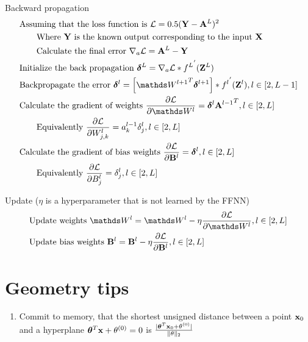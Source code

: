Backward propagation
\begin {equation} \begin {split}
& \text {Assuming that the loss function is } \cL = 0.5 (\vY - \vA^L)^2 \\
& \qquad \text {Where $\vY$ is the known output corresponding to the input $\vX$} \\
& \qquad \text {Calculate the final error } \nabla_a \cL =  \vA^L - \vY \\
& \text {Initialize  the back propagation } \vdelta^L =  \ewise {\nabla_a \cL} {{f^L}^{'} (\vZ^L)} \\
& \text {Backpropagate the error } \vdelta^l =  \ewise {\left[ {\mW^{l+1}}^T \vdelta^{l+1} \right]} {{f^{l}}^{'} (\vZ^l)}, l \in [2, L-1] \\
& \text {Calculate the gradient of weights } \frac {\partial \cL} {\partial \mW^l} = \vdelta^l {\vA^{l-1}}^T, l \in [2, L] \\
& \qquad \text {Equivalently } \frac {\partial \cL} {\partial W_{j,k}^l} = a_k^{l-1} \delta_j^l, l \in [2, L] \\
& \text {Calculate the gradient of bias weights } \frac {\partial \cL} {\partial \vB^l} = \vdelta^l, l \in [2, L] \\
& \qquad \text {Equivalently } \frac {\partial \cL} {\partial B_j^l} = \delta_j^l, l \in [2, L] \\
\end {split} \end {equation}

Update ($\eta$ is a hyperparameter that is not learned by the FFNN)
\begin {equation} \begin {split}
& \text {Update weights } \mW^l = \mW^l - \eta \frac {\partial \cL} {\partial \mW^l}, l \in [2, L] \\
& \text {Update bias weights } \vB^l = \vB^l - \eta \frac {\partial \cL} {\partial \vB^l}, l \in [2, L] \\
\end {split} \end {equation}

\section {Geometry tips}
\begin {enumerate}
\item Commit to memory, that the shortest unsigned distance between a point $\mathbf{x}_0$ and a hyperplane $\bm{\theta}^T \mathbf{x} + \mathrm{\theta^{(0)}} = 0$ is $\frac {|{\bm{\theta}^T \mathbf{x}_0 + \mathrm{\theta^{(0)}}}|} {\|\theta\|_2}$
\end {enumerate}

